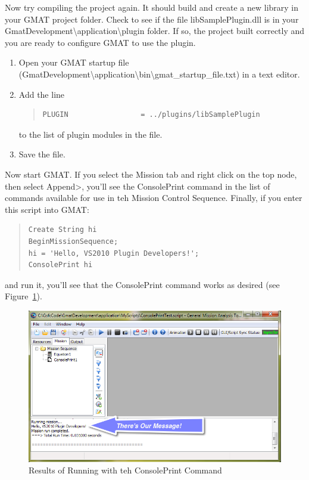 \documentclass[10pt,letterpaper]{article}
\begin{document}
Now try compiling the project again.  It should build and create a new library in your GMAT project folder.  Check to see if the file libSamplePlugin.dll is in your GmatDevelopment{\textbackslash}application{\textbackslash}plugin folder.  If so, the project built correctly and you are ready to configure GMAT to use the plugin.

\begin{enumerate}
\item Open your GMAT startup file (GmatDevelopment{\textbackslash}application{\textbackslash}bin{\textbackslash}gmat{\_}startup{\_}file.txt) in a text editor.
\item Add the line
\begin{quote}
\begin{verbatim}
PLUGIN                 = ../plugins/libSamplePlugin
\end{verbatim}
\end{quote}
\noindent to the list of plugin modules in the file.
\item Save the file.
\end{enumerate}

Now start GMAT.  If you select the Mission tab and right click on the top node, then select Append\textgreater, you'll see the ConsolePrint command in the list of commands available for use in teh Mission Control Sequence.   Finally, if you enter this script into GMAT:
 
\begin{quote}
\begin{verbatim}
Create String hi
BeginMissionSequence;
hi = 'Hello, VS2010 Plugin Developers!';
ConsolePrint hi
\end{verbatim}
\end{quote}

\noindent and run it, you'll see that the ConsolePrint command works as desired (see Figure~\ref{Results}).

\begin{figure}[htb]
\begin{center}
\includegraphics[scale=0.54]{images/FinalOutput.png}
\caption{\label{Results}Results of Running with teh ConsolePrint Command}
\end{center}
\end{figure}
 
\end{document}
